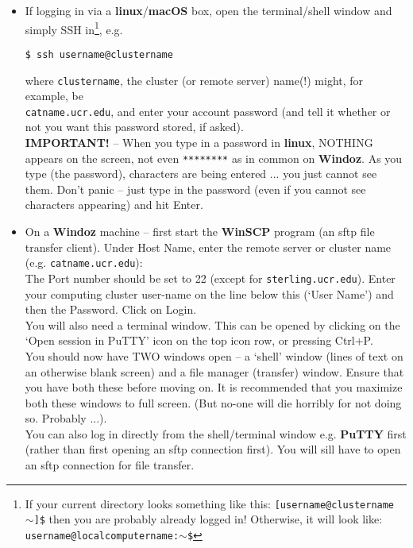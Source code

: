 \begin{itemize}
\vspace{1mm}
\item If logging in via a \textbf{linux}/\textbf{macOS} box, open the terminal/shell window and simply SSH in\footnote{If your current directory looks something like this: \texttt{[username@clustername \(\sim\)]\$}
then you are probably already logged in! Otherwise, it will look like: \texttt{username@localcomputername:\(\sim\)\$}}, e.g.

\vspace{-1mm}
\begin{verbatim}
$ ssh username@clustername
\end{verbatim}
\vspace{-1mm}

where \texttt{clustername}, the cluster (or remote server) name(!) might, for example, be
\\\texttt{catname.ucr.edu}, and enter your  account password (and tell it whether or not you want this password stored, if asked).
\vspace{1mm}
\\\textbf{IMPORTANT!} -- When you type in a password in \textbf{linux}, NOTHING appears on the screen, not even \texttt{********} as in common on \textbf{Windoz}. As you type (the password), characters are being entered ... you just cannot see them. Don't panic -- just type in the password (even if you cannot see characters appearing) and hit \textsf{\scriptsize Enter}.

\vspace{1mm}
\item On a \textbf{Windoz} machine – first start the \textbf{WinSCP} program (an sftp file transfer client). Under \textsf{\footnotesize Host Name}, enter the remote server or cluster name (e.g. \texttt{catname.ucr.edu}):
\\The \textsf{\footnotesize Port number} should be set to \textsf{\footnotesize 22} (except for \texttt{sterling.ucr.edu}). Enter your computing cluster user-name on the line below this (‘\textsf{\footnotesize User Name}’) and then the \textsf{\footnotesize Password}. Click on \textsf{\footnotesize Login}.
\\You will also need a terminal window. This can be opened by clicking on the ‘\textsf{\footnotesize Open session in PuTTY}’ icon on the top icon row, or pressing \textsf{\footnotesize Ctrl+P}. \\You should now have TWO windows open – a ‘shell’ window (lines of text on an otherwise blank screen) and a file manager (transfer) window. Ensure that you have both these before moving on. It is recommended that you maximize both these windows to full screen. (But no-one will die horribly for not doing so. Probably ...).
\\ You can also log in directly from the shell/terminal window e.g. \textbf{PuTTY} first (rather than first opening an sftp connection first).
 You will sill have to open an sftp connection for file transfer.
\end{itemize}

